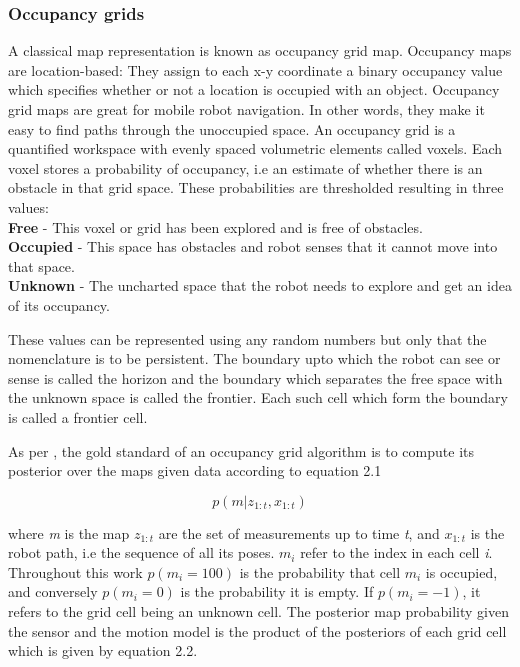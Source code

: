 \subsubsection{Occupancy grids}
A classical map representation is known as occupancy grid map. Occupancy maps are location-based: They assign to each x-y coordinate a binary occupancy value which specifies whether or not a location is occupied with an object. Occupancy grid maps are great for mobile robot navigation\cite{25}. In other words, they make it easy to find paths through the unoccupied space. An occupancy grid is a quantified workspace with evenly spaced volumetric elements called voxels. Each voxel stores a probability of occupancy, i.e an estimate of whether there is an obstacle in that grid space. These probabilities are thresholded resulting in three values: \\
\noindent \textbf{Free} - This voxel or grid has been explored and is free of obstacles.\\
\textbf{Occupied} - This space has obstacles and robot senses that it cannot move into that space.\\
\textbf{Unknown} - The uncharted space that the robot needs to explore and get an idea of its occupancy.

\par These values can be represented using any random numbers but only that the nomenclature is to be persistent. The boundary upto which the robot can see or sense is called the horizon and the boundary which separates the free space with the unknown space is called the frontier. Each such cell which form the boundary is called a frontier cell. 

As per \cite{12}, the gold standard of an occupancy grid algorithm is to compute its posterior over the maps given data according to equation 2.1

\begin{equation} \label{eq:posterior}
    p(m|z_{1:t},x_{1:t})
\end{equation}

\noindent where \textit{m} is the map ${z_{1:t}}$ are the set of measurements up to time \textit{t}, and ${x_{1:t}}$ is the robot path, i.e the sequence of all its poses. ${m_i}$ refer to the index in each cell \textit{i}. Throughout this work $p(m_i = 100)$ is the probability that cell $m_i$ is occupied, and conversely $p(m_i = 0)$ is the probability it is empty. If $p(m_i = -1)$, it refers to the grid cell being an unknown cell. The posterior map probability given the sensor and the motion model is the product of the posteriors of each grid cell which is given by equation 2.2. 

